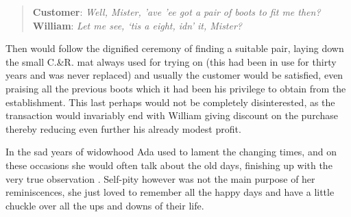 \begin{quote}
\textbf{Customer}: \textit{Well, Mister, 'ave 'ee got a pair of boots to fit me then?} \\
\textbf{William}: \textit{Let me see, ‘tis a eight, idn’ it, Mister?}
\end{quote}


Then would follow the dignified ceremony of finding a suitable pair, laying down the small C.\&R. mat always used for trying on (this had been in use for thirty years and was never replaced) and usually the customer would be satisfied, even praising all the previous boots which it had been his privilege to obtain from the establishment. This last perhaps would not be completely disinterested, as the transaction would invariably end with William giving discount on the purchase thereby reducing even further his already modest profit.

In the sad years of widowhood Ada used to lament the changing times, and on these occasions she would often talk about the old days, finishing up with the very true observation . Self-pity however was not the main purpose of her reminiscences, she just loved to remember all the happy days and have a little chuckle over all the ups and downs of their life.